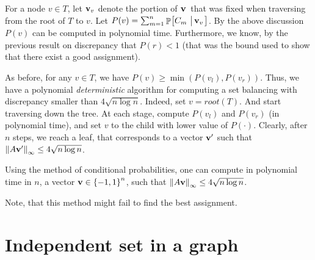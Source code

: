 For a node $v \in T$, let $\mathbf{v}_v$ denote the portion of $\mathbf{v}\,$
that was fixed when traversing from the root of $T$ to $v$.  Let
$P(v) = \sum_{\ind=1}^{n} \Prob{C_\ind \sep{\vecA_v}}$.  By the above
discussion $P(v)$ can be computed in polynomial time.  Furthermore, we
know, by the previous result on discrepancy that $P(r) < 1$ (that was
the bound used to show that there exist a good assignment).

As before, for any $v \in T$, we have $P(v) \geq \min(P(v_l),
P(v_r))$. Thus, we have a polynomial \emph{deterministic} algorithm
for computing a set balancing with discrepancy smaller than $4\sqrt{n
   \log{n}}$. Indeed, set $v = root(T)$. And start traversing down the
tree. At each stage, compute $P(v_l)$ and $P(v_r)$ (in polynomial
time), and set $v$ to the child with lower value of
$P(\cdot)$. Clearly, after $n$ steps, we reach a leaf, that
corresponds to a vector $\mathbf{v}'$ such that $\left\| {A \mathbf{v}'} \right\|_{\infty}
\leq 4 \sqrt{n \log{n}}$.

\begin{theorem}
    Using the method of conditional probabilities, one can compute in
    polynomial time in $n$, a vector $\mathbf{v} \in \left\{ {-1,1} \right\}^n$, such
    that $\left\| {A \mathbf{v}} \right\|_\infty \leq 4 \sqrt{n \log{n}}$.
\end{theorem}

Note, that this method might fail to find the best
assignment. 




\section{Independent set in a graph}

